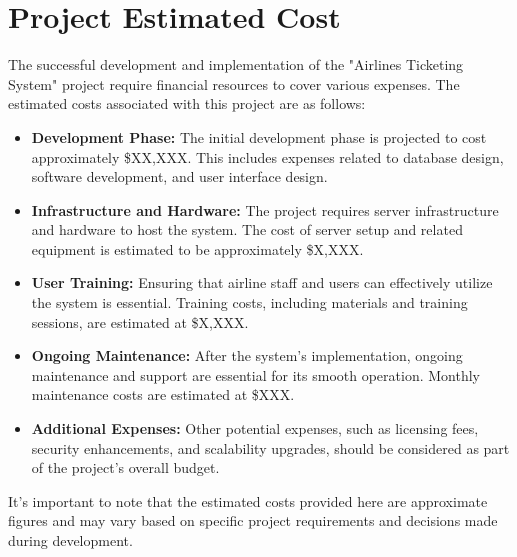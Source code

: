 \section{Project Estimated Cost}
The successful development and implementation of the "Airlines Ticketing System" project require financial resources to cover various expenses. The estimated costs associated with this project are as follows:

\begin{itemize}
    \item \textbf{Development Phase:} The initial development phase is projected to cost approximately \$XX,XXX. This includes expenses related to database design, software development, and user interface design.

    \item \textbf{Infrastructure and Hardware:} The project requires server infrastructure and hardware to host the system. The cost of server setup and related equipment is estimated to be approximately \$X,XXX.

    \item \textbf{User Training:} Ensuring that airline staff and users can effectively utilize the system is essential. Training costs, including materials and training sessions, are estimated at \$X,XXX.

    \item \textbf{Ongoing Maintenance:} After the system's implementation, ongoing maintenance and support are essential for its smooth operation. Monthly maintenance costs are estimated at \$XXX.

    \item \textbf{Additional Expenses:} Other potential expenses, such as licensing fees, security enhancements, and scalability upgrades, should be considered as part of the project's overall budget.

\end{itemize}

It's important to note that the estimated costs provided here are approximate figures and may vary based on specific project requirements and decisions made during development.



\clearpage